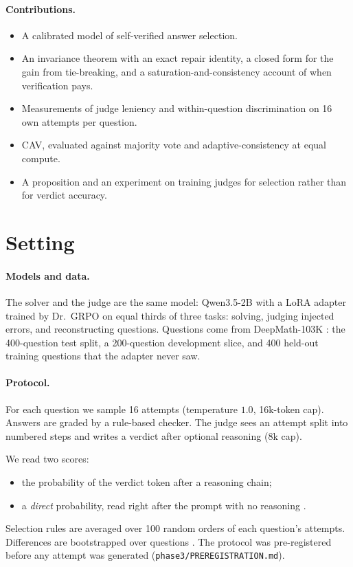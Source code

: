 \documentclass[11pt]{article}
\begin{document}
\paragraph{Contributions.}
\begin{itemize}
\item A calibrated model of self-verified answer selection.
\item An invariance theorem with an exact repair identity, a closed form for the gain from tie-breaking, and a
  saturation-and-consistency account of when verification pays.
\item Measurements of judge leniency and within-question discrimination on 16 own attempts per question.
\item CAV, evaluated against majority vote and adaptive-consistency at equal compute.
\item A proposition and an experiment on training judges for selection rather than for verdict accuracy.
\end{itemize}

\section{Setting}
\label{sec:setting}

\paragraph{Models and data.}
The solver and the judge are the same model: Qwen3.5-2B with a LoRA adapter trained by Dr.~GRPO \citep{liu2025drgrpo}
on equal thirds of three tasks: solving, judging injected errors, and reconstructing questions. Questions come from
DeepMath-103K \citep{he2026deepmath}: the 400-question test split, a 200-question development slice, and 400 held-out
training questions that the adapter never saw.

\paragraph{Protocol.}
For each question we sample 16 attempts (temperature $1.0$, 16k-token cap). Answers are graded by a rule-based checker.
The judge sees an attempt split into numbered steps and writes a verdict after optional reasoning (8k cap).

We read two scores:
\begin{itemize}
\item the probability of the verdict token after a reasoning chain;
\item a \emph{direct} probability, read right after the prompt with no reasoning \citep{kadavath2022know}.
\end{itemize}
Selection rules are averaged over 100 random orders of each question's attempts. Differences are bootstrapped over
questions \citep{miller2024errorbars}. The protocol was pre-registered before any attempt was generated
(\texttt{phase3/PREREGISTRATION.md}).
\end{document}
